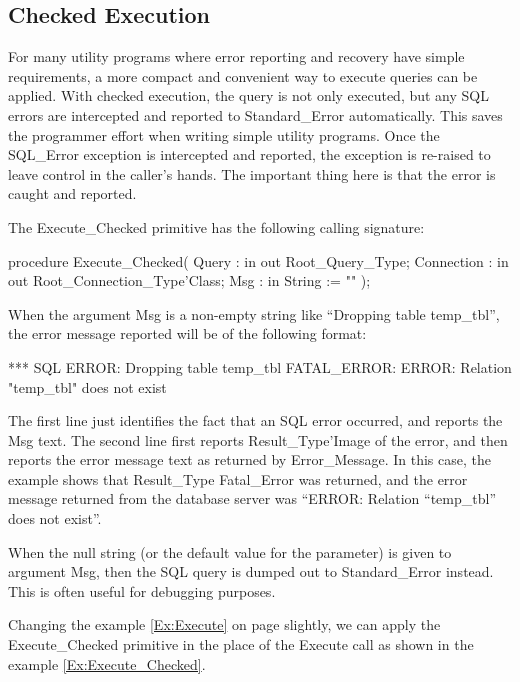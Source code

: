 \documentclass[english,letterpaper]{book}
\begin{document}
\subsection{Checked Execution}

For many utility programs where error reporting
and recovery have simple requirements, a more compact and convenient
way to execute queries can be applied. With checked execution, the
query is not only executed, but any SQL errors are intercepted and
reported to Standard\_Error automatically. This saves the programmer
effort when writing simple utility programs. Once the SQL\_Error exception
is intercepted and reported, the exception is re-raised to leave control
in the caller's hands. The important thing here is that the error
is caught and reported.

The Execute\_Checked primitive has the following calling signature:

\begin{Code}
procedure Execute_Checked(
   Query :      in out Root_Query_Type;
   Connection : in out Root_Connection_Type'Class;
   Msg :        in     String := ""
);
\end{Code}

When the argument Msg is a non-empty string like ``Dropping table
temp\_tbl'', the error message reported will be of the following
format:

\begin{Example}
*** SQL ERROR: Dropping table temp_tbl
FATAL_ERROR: ERROR: Relation "temp_tbl" does not exist
\end{Example}

The first line just identifies the fact that an SQL error occurred,
and reports the Msg text. The second line first reports Result\_Type'Image
of the error, and then reports the error message text as returned
by Error\_Message. In this case, the example shows that Result\_Type
Fatal\_Error was returned, and the error message returned from the
database server was ``ERROR: Relation ``temp\_tbl'' does not
exist''.

When the null string (or the default value for
the parameter) is given to argument Msg, then the SQL query is dumped
out to Standard\_Error instead. This is often useful for debugging
purposes.

Changing the example \ref{Ex:Execute} on page \pageref{Ex:Execute}
slightly, we can apply the Execute\_Checked primitive in the place
of the Execute call as shown in the example \ref{Ex:Execute_Checked}.
\end{document}
